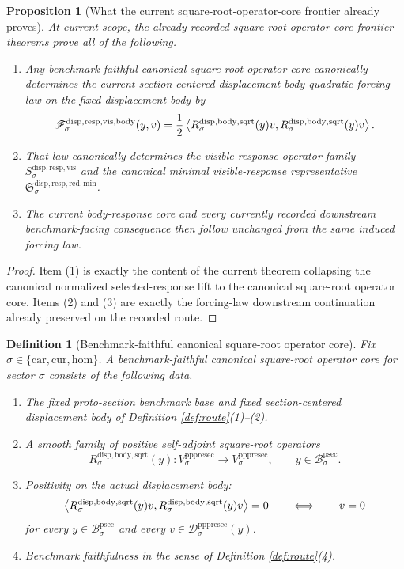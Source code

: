 \documentclass[11pt]{article}
\newcommand{\Car}{\mathrm{car}}
\newcommand{\Cur}{\mathrm{cur}}
\newcommand{\Hom}{\mathrm{hom}}
\newcommand{\ProtoSectionBody}[1]{\mathcal B_{#1}^{\mathrm{psec}}}
\newcommand{\PrePreProtoSectionVertical}[1]{V_{#1}^{\mathrm{pppresec}}}
\newcommand{\PrePreProtoSectionResidualBody}[1]{\mathcal D_{#1}^{\mathrm{pppresec}}}
\newcommand{\VisibleBodyForcingLaw}[1]{\mathscr F_{#1}^{\mathrm{disp,resp,vis,body}}}
\newcommand{\VisibleResponseOperator}[1]{S_{#1}^{\mathrm{disp,resp,vis}}}
\newcommand{\MinimalReducedStructure}{\mathfrak S^{\mathrm{disp,resp,red,min}}}
\newcommand{\SquareRootOperator}[1]{R_{#1}^{\mathrm{disp,body,sqrt}}}
\newtheorem{definition}{Definition}
\newtheorem{proposition}{Proposition}
\begin{document}
\begin{proposition}[What the current square-root-operator-core frontier already proves]
\label{prop:frontier}
At current scope, the already-recorded square-root-operator-core frontier theorems prove all of the following.
\begin{enumerate}
    \item Any benchmark-faithful canonical square-root operator core canonically determines the current section-centered displacement-body quadratic forcing law on the fixed displacement body by
    \[
    \VisibleBodyForcingLaw{\sigma}(y,v)
    =
    \frac{1}{2}
    \ev{
    \SquareRootOperator{\sigma}(y)v,
    \SquareRootOperator{\sigma}(y)v
    }.
    \]
    \item That law canonically determines the visible-response operator family \(\VisibleResponseOperator{\sigma}\) and the canonical minimal visible-response representative \(\MinimalReducedStructure_{\sigma}\).
    \item The current body-response core and every currently recorded downstream benchmark-facing consequence then follow unchanged from the same induced forcing law.
\end{enumerate}
\end{proposition}

\begin{proof}
Item (1) is exactly the content of the current theorem collapsing the canonical normalized selected-response lift to the canonical square-root operator core. Items (2) and (3) are exactly the forcing-law downstream continuation already preserved on the recorded route.
\end{proof}

\begin{definition}[Benchmark-faithful canonical square-root operator core]
\label{def:sqrtcore}
Fix \(\sigma\in\{\Car,\Cur,\Hom\}\). A \emph{benchmark-faithful canonical square-root operator core} for sector \(\sigma\) consists of the following data.
\begin{enumerate}
    \item The fixed proto-section benchmark base and fixed section-centered displacement body of Definition \ref{def:route}(1)--(2).
    \item A smooth family of positive self-adjoint square-root operators
    \[
    \SquareRootOperator{\sigma}(y):
    \PrePreProtoSectionVertical{\sigma}\to\PrePreProtoSectionVertical{\sigma},
    \qquad
    y\in\ProtoSectionBody{\sigma}.
    \]
    \item Positivity on the actual displacement body:
    \[
    \ev{
    \SquareRootOperator{\sigma}(y)v,
    \SquareRootOperator{\sigma}(y)v
    }
    =0
    \qquad\Longleftrightarrow\qquad
    v=0
    \]
    for every \(y\in\ProtoSectionBody{\sigma}\) and every \(v\in\PrePreProtoSectionResidualBody{\sigma}(y)\).
    \item Benchmark faithfulness in the sense of Definition \ref{def:route}(4).
\end{enumerate}
\end{definition}
\end{document}

